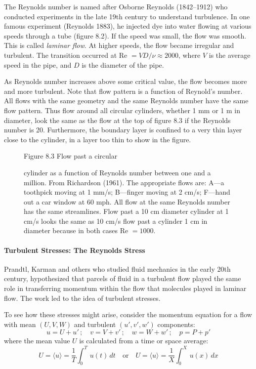 The Reynolds number is named after Osborne Reynolds (1842--1912) who
conducted experiments in the late 19th century to understand
turbulence.  In one famous experiment
(Reynolds 1883), he injected dye into water flowing at various speeds
through a tube (figure 8.2). If the speed was small, the flow was
smooth. This is called \textit{laminar flow}. At higher speeds, the
flow became irregular and turbulent. The transition occurred at Re $ =
VD/\nu \approx 2000$, where $V$ is the average speed in the pipe, and
$D$ is the diameter of the pipe.

As Reynolds number increases above some critical value, the flow
becomes more and more turbulent. Note that flow pattern is a function
of Reynold's number. All flows with the same geometry and the same
Reynolds number have the same flow pattern. Thus flow around all
circular cylinders, whether 1 mm or 1 m in diameter, look the same as
the flow at the top of figure 8.3 if the Reynolds number is
20. Furthermore, the boundary layer is confined to a very thin layer
close to the cylinder, in a layer too thin to show in the figure.

\begin{figure}[t!]
\footnotesize
Figure 8.3 Flow past a circular \rule{0mm}{3ex}cylinder as a function
of Reynolds number between one and a million. From Richardson
(1961). The appropriate flows are: A---a toothpick moving at 1 mm/s;
B---finger moving at 2 cm/s; F---hand out a car window at 60 mph. All
flow at the same Reynolds number has the same streamlines. Flow past a
10 cm diameter cylinder at 1 cm/s looks the same as 10 cm/s flow past
a cylinder 1 cm in diameter because in both cases Re $= 1000$.
\label{fig:turbsketch}
\vspace{-2ex}
\end{figure}

\paragraph{Turbulent Stresses: The Reynolds Stress}
Prandtl, Karman and
others who studied fluid mechanics in the early 20th century,
hypothesized that parcels of fluid in a turbulent flow played the same
role in transferring momentum within the flow that molecules played in
laminar flow. The work led to the idea of turbulent stresses.

To see how these stresses might arise, consider the momentum equation
for a flow with mean $(U, V, W)$ and turbulent $(u', v', w')$
components:
\begin{equation}
u=U+u' \,;\quad v = V+v' \,;\quad w=W+w' \, ;\quad p=P+p'
\end{equation}
where the mean value $U$ is calculated from a time or space average:
\begin{equation}
U = \langle u \rangle =\frac{1}{T}\int^T_0\,u(t)\,dt \quad \text{or}\quad
U = \langle u \rangle =\frac{1}{X}\int^X_0\,u(x)\,dx
\end{equation}


